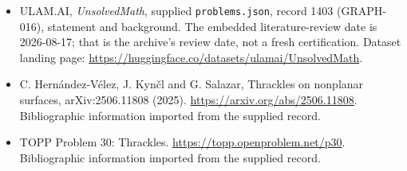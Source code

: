 \documentclass[11pt,a4paper]{article}
\begin{document}
{\small

\begin{itemize}

\item[\hypertarget{source:1403:1}{S1}] ULAM.AI, \emph{UnsolvedMath}, supplied \texttt{problems.json}, record 1403 (GRAPH-016), statement and background. The embedded literature-review date is 2026-08-17; that is the archive’s review date, not a fresh certification. Dataset landing page: \url{https://huggingface.co/datasets/ulamai/UnsolvedMath}.

\item[\hypertarget{source:1403:2}{S2}] C. Hernández-Vélez, J. Kynčl and G. Salazar, Thrackles on nonplanar surfaces, arXiv:2506.11808 (2025). \url{https://arxiv.org/abs/2506.11808}. Bibliographic information imported from the supplied record.

\item[\hypertarget{source:1403:3}{S3}] TOPP Problem 30: Thrackles. \url{https://topp.openproblem.net/p30}. Bibliographic information imported from the supplied record.

\end{itemize}

}

\label{end:1403}
\end{document}
